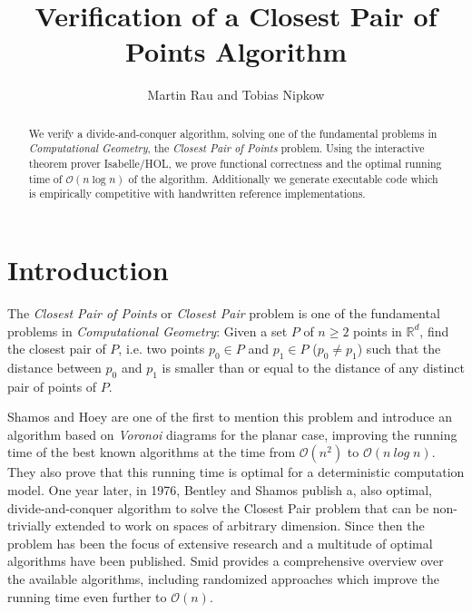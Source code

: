 \documentclass{llncs}
\begin{document}
\title{Verification of a Closest Pair of Points Algorithm}
\author{Martin Rau and Tobias Nipkow}
\date{}
\maketitle

\begin{abstract}
We verify a divide-and-conquer algorithm, solving one of the fundamental problems
in \textit{Computational Geometry}, the \textit{Closest Pair of Points} problem.
Using the interactive theorem prover Isabelle/HOL, we prove functional correctness
and the optimal running time of $\mathcal{O}(n \log n)$ of the algorithm. 
Additionally we generate executable code which is empirically competitive with handwritten
 reference implementations.
\end{abstract}

\section{Introduction}

The \textit{Closest Pair of Points} or \textit{Closest Pair} problem is one of the fundamental
problems in \textit{Computational Geometry}: Given a set $P$ of $n \geq 2$ points in $\mathbb{R}^d$,
find the closest pair of $P$, i.e. two points $p_0 \in P$ and $p_1 \in P$ ($p_0 \ne p_1$) such that 
the distance between $p_0$ and $p_1$ is smaller than or equal to the distance of any distinct pair 
of points of $P$.

Shamos and Hoey \cite{Closest-Point-Problems:1975} are one of the first to mention this problem and
introduce an algorithm based on \textit{Voronoi} diagrams for the planar case, improving the running 
time of the best known algorithms at the time from $\mathcal{O}(n^2)$ to
$\mathcal{O}(n\ \mathit{log}\;n)$. They also prove that this running time is optimal for a
deterministic computation model. One year later, in 1976, Bentley and Shamos
\cite{Divide-And-Conquer-In-Multidimensional-Space:1976} publish a, also optimal, divide-and-conquer
algorithm to solve the Closest Pair problem that can be non-trivially extended to work on
spaces of arbitrary dimension. Since then the problem has been the focus of extensive research and
a multitude of optimal algorithms have been published. Smid \cite{Handbook-Computational-Geometry:2000}
provides a comprehensive overview over the available algorithms, including randomized approaches which
improve the running time even further to $\mathcal{O}(n)$.
\end{document}
